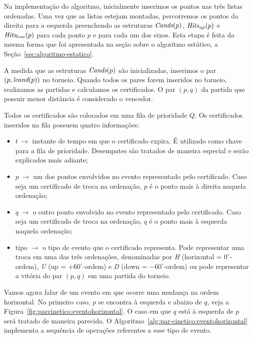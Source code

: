 Na implementação do algoritmo, inicialmente inserimos os pontos nas três listas ordenadas.
Uma vez que as listas estejam montadas, percorremos os pontos da direita para a esquerda
preenchendo as estruturas $\textit{Cands}(p)$, $\textit{Hits}_{up}(p)$ e $\textit{Hits}_{low}(p)$ para cada ponto $p$ e
para cada um dos eixos.
Esta etapa é feita da mesma forma que foi apresentada na seção sobre o algoritmo estático, a
Seção~\ref{sec:algoritmo-estatico}.

A medida que as estruturas $\textit{Cands}(p)$ são inicializadas, inserimos o par $(p, \textit{lcand}(p))$ no
torneio.
Quando todos os pares forem inseridos no torneio, realizamos as partidas e calculamos os
certificados.
O par $(p, q)$ da partida que possuir menor distância é considerado o vencedor.

Todos os certificados são colocados em uma fila de prioridade $Q$.
Os certificados inseridos na fila possuem quatro informações:
\begin{itemize}
    \item $t~\rightarrow$ instante de tempo em que o certificado
    expira.
    É utilizado como chave para a fila de prioridade.
    Desempates são tratados de maneira especial e serão explicados
    mais adiante;
    \item $p~\rightarrow$ um dos pontos envolvidos no evento
    representado pelo certificado.
    Caso seja um certificado de troca na ordenação, $p$ é o ponto mais à direita naquela ordenação;
    \item $q~\rightarrow$ o outro ponto envolvido no evento representado pelo certificado.
    Caso seja um certificado de troca na ordenação, $q$ é o ponto mais à esquerda naquela
    ordenação;
    \item tipo $ \rightarrow$ o tipo de evento que o certificado representa.
    Pode representar uma troca em uma das três ordenações, denominadas por \textit{H} (horizontal =
    $0^\circ$-ordem), \textit{U} (up = $+60^\circ$-ordem) e \textit{D} (down = $-60^\circ$-ordem) ou pode
    representar a vitória do par $(p, q)$ em uma partida do torneio.
\end{itemize}



Vamos agora falar de um evento em que ocorre uma mudança na ordem horizontal.
No primeiro caso, $p$ se encontra à esquerda e abaixo de $q$, veja a
Figura~\ref{fig:parcinetico:eventohorizontal}.
O caso em que $q$ está à esquerda de $p$ será tratado de maneira parecida.
O Algoritmo~\ref{alg:par-cinetico:eventohorizontal} implementa a sequência de operações referentes
a esse tipo de evento.


